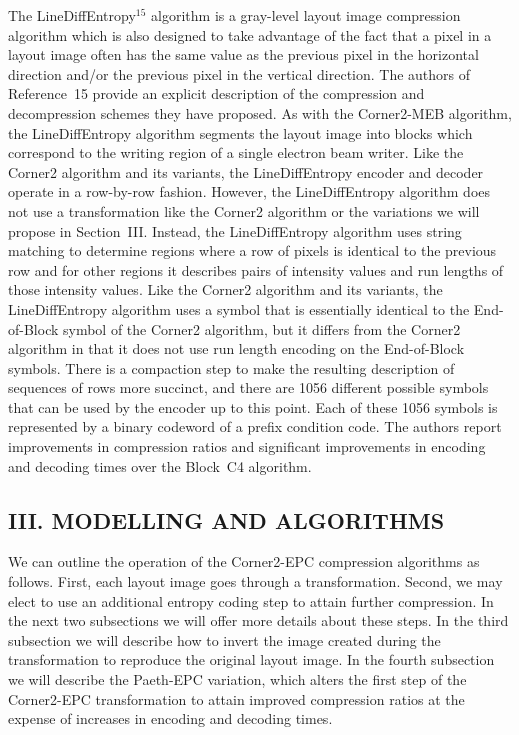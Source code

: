 \documentclass{article}
\begin{document}
The LineDiffEntropy$^{15}$ algorithm is a gray-level layout image
compression algorithm which is also designed to take advantage of the
fact that a pixel in a layout image often has the same value as the previous
pixel in the horizontal direction and/or the previous pixel in the 
vertical direction.  The authors of Reference~15 provide an explicit
description of the compression and decompression schemes they have proposed.
As with the Corner2-MEB algorithm, the LineDiffEntropy algorithm segments the
layout image into blocks which correspond to the writing region of a single
electron beam writer.
Like the Corner2 algorithm and its variants, the LineDiffEntropy encoder and
decoder operate in a row-by-row fashion.  However, the LineDiffEntropy 
algorithm does not use a transformation like the Corner2 algorithm or the
variations we will propose in Section~III.  Instead, the LineDiffEntropy 
algorithm uses string matching to determine regions where a row of pixels
is identical to the previous row and for other regions it describes pairs
of intensity values and run lengths of those intensity values.  Like the
Corner2 algorithm and its variants, the LineDiffEntropy algorithm uses a
symbol that is essentially identical to the End-of-Block symbol of 
the Corner2 algorithm, but it differs from the Corner2 algorithm in that
it does not use run length encoding on the End-of-Block symbols.
There is a compaction step to make the resulting description of sequences
of rows more succinct, and there are 1056 different possible symbols 
that can be used by the encoder up to this point.  Each of these 1056
symbols is represented by a binary codeword of a prefix condition code.
The authors report improvements in compression ratios and significant
improvements in encoding and decoding times over the Block~C4 algorithm. 

\subsection*{III. MODELLING AND ALGORITHMS}
We can outline the operation of the Corner2-EPC compression algorithms as 
follows.  First, each layout image goes through a transformation.  Second, 
we may elect to use an additional entropy coding step to attain further
compression.  In the next two subsections we will offer more details
about these steps.  In the third subsection we will describe how to invert
the image created during the transformation to reproduce the original layout
image.  In the fourth subsection we will describe the Paeth-EPC variation, 
which alters the first step of the Corner2-EPC transformation to attain 
improved compression ratios at
the expense of increases in encoding and decoding times.
\end{document}
